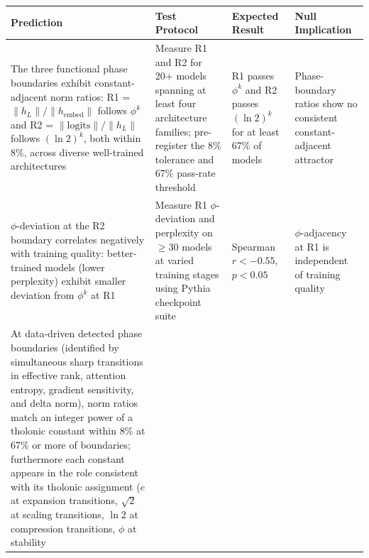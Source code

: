 \documentclass[12pt]{article}
\begin{document}
\begin{longtable}[]{@{}
  >{\raggedright\arraybackslash}p{}
  >{\raggedright\arraybackslash}p{}
  >{\raggedright\arraybackslash}p{}
  >{\raggedright\arraybackslash}p{}@{}}
\toprule\noalign{}
\begin{minipage}[b]{\linewidth}\raggedright
Prediction
\end{minipage} & \begin{minipage}[b]{\linewidth}\raggedright
Test Protocol
\end{minipage} & \begin{minipage}[b]{\linewidth}\raggedright
Expected Result
\end{minipage} & \begin{minipage}[b]{\linewidth}\raggedright
Null Implication
\end{minipage} \\
\midrule\noalign{}
\endhead
\bottomrule\noalign{}
\endlastfoot
The three functional phase boundaries exhibit constant-adjacent norm
ratios: R1 = \(\|h_L\|/\|h_{\text{embed}}\|\) follows \(\phi^k\) and R2
= \(\|\text{logits}\|/\|h_L\|\) follows \((\ln 2)^k\), both within 8\%,
across diverse well-trained architectures & Measure R1 and R2 for 20+
models spanning at least four architecture families; pre-register the
8\% tolerance and 67\% pass-rate threshold & R1 passes \(\phi^k\) and R2
passes \((\ln 2)^k\) for at least 67\% of models & Phase-boundary ratios
show no consistent constant-adjacent attractor \\
\(\phi\)-deviation at the R2 boundary correlates negatively with
training quality: better-trained models (lower perplexity) exhibit
smaller deviation from \(\phi^k\) at R1 & Measure R1 \(\phi\)-deviation
and perplexity on \(\geq 30\) models at varied training stages using
Pythia checkpoint suite & Spearman \(r < -0.55\), \(p < 0.05\) &
\(\phi\)-adjacency at R1 is independent of training quality \\
At data-driven detected phase boundaries (identified by simultaneous
sharp transitions in effective rank, attention entropy, gradient
sensitivity, and delta norm), norm ratios match an integer power of a
tholonic constant within 8\% at 67\% or more of boundaries; furthermore
each constant appears in the role consistent with its tholonic
assignment (\(e\) at expansion transitions, \(\sqrt{2}\) at scaling
transitions, \(\ln 2\) at compression transitions, \(\phi\) at stability

\end{longtable}
\end{document}
